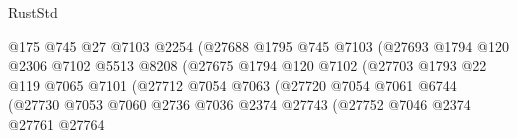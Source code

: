 \begin{lexlean}{RustStd}
\begin{coremodule}
{\begin{coremodule}
{{{{{{{{{{{{{{{{{{{{{{{{{{{{{{{{{{                                            @175
                                            @745
                                            @27
                                            @7103
                                            @2254
                                            (@27688
                                              @1795
                                              @745
                                              @7103
                                              (@27693
                                                @1794
                                                @120
                                                @2306
                                                @7102
                                                @5513
                                                @8208
                                                (@27675
                                                  @1794
                                                  @120
                                                  @7102
                                                  (@27703
                                                    @1793
                                                    @22
                                                    @119
                                                    @7065
                                                    @7101
                                                    (@27712
                                                      @7054
                                                      @7063
                                                      (@27720
                                                        @7054
                                                        @7061
                                                        @6744
                                                        (@27730
                                                          @7053
                                                          @7060
                                                          @2736
                                                          @7036
                                                          @2374
                                                          @27743
                                                          (@27752
                                                            @7046
                                                            @2374
                                                            @27761
                                                            @27764
}}}}}}}}}}}}}}}}}}}}}}}}}}}}}}}}}}
\end{coremodule}}
\end{coremodule}
\end{lexlean}
